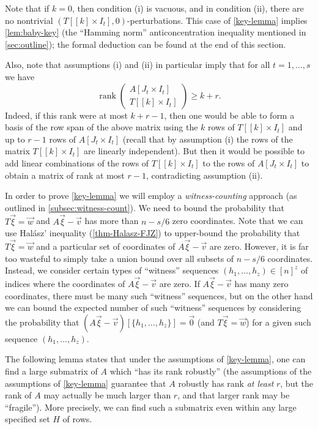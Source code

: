 \documentclass[english]{article}
\theoremstyle{remark}
\numberwithin{equation}{section}
\numberwithin{figure}{section}
\newcommand{\on}{\operatorname}
\begin{document}
Note that if $k=0$, then condition (i) is vacuous, and in condition (ii), there are no nontrivial $(T[[k]\times I_t],0)$-perturbations. This case of \cref{key-lemma} implies \cref{lem:baby-key} (the ``Hamming norm'' anticoncentration inequality mentioned in \cref{sec:outline}); the formal deduction can be found at the end of this section.

Also, note that assumptions (i) and (ii) in particular imply that for all $t=1,\dots,s$ we have
\begin{equation}\label{eq:assumption-key-lemma-consequence}
\on{rank}\begin{pmatrix}A[J_t\times I_t]\\ T[[k]\times I_t]\end{pmatrix}\ge k+r.
\end{equation}
Indeed, if this rank were at most $k+r-1$, then one would be able to form a basis of the row span of the above matrix using the $k$ rows of $T[[k]\times I_t]$  and up to $r-1$ rows of $A[J_t\times I_t]$ (recall that by assumption (i) the rows of the matrix $T[[k]\times I_t]$ are linearly independent). But then it would be possible to add linear combinations of the rows of $T[[k]\times I_t]$ to the rows of $A[J_t\times I_t]$ to obtain a matrix of rank at most $r-1$, contradicting assumption (ii).

In order to prove \cref{key-lemma} we will employ a \emph{witness-counting} approach (as outlined in \cref{subsec:witness-count}). We need to bound the probability that $T\vec{\xi}=\vec{w}$ and $A\vec{\xi}-\vec{v}$ has more than $n-s/6$ zero coordinates. Note that we can use Hal\'asz' inequality (\cref{thm-Halasz-FJZ}) to upper-bound the probability
that $T\vec{\xi}=\vec{w}$ and a particular set of coordinates of
$A\vec{\xi}-\vec{v}$ are zero. However, it is far too wasteful to simply
take a union bound over all subsets of $n-s/6$ coordinates. Instead, we consider certain types of ``witness'' sequences $(h_1,\dots,h_z)\in [n]^z$ of indices where the coordinates of $A\vec{\xi}-\vec{v}$ are zero. If $A\vec{\xi}-\vec{v}$ has many zero coordinates, there must be many such ``witness'' sequences, but on the other hand we can bound the expected number of such ``witness'' sequences by considering the probability that $(A\vec{\xi}-\vec{v})[\{h_1,\dots,h_z\}]=\vec 0$ (and $T\vec{\xi}=\vec{w}$) for a given such sequence $(h_1,\dots,h_z)$.

The following lemma states that under the assumptions of \cref{key-lemma}, one can find a large submatrix of $A$ which ``has its
rank robustly'' (the assumptions of the assumptions of \cref{key-lemma} guarantee that $A$ robustly has rank \emph{at least}
$r$, but the rank of $A$  may actually be much larger than $r$, and that larger rank may be ``fragile''). More precisely, we can find such a submatrix even within any large specified set $H$ of rows.
\end{document}
